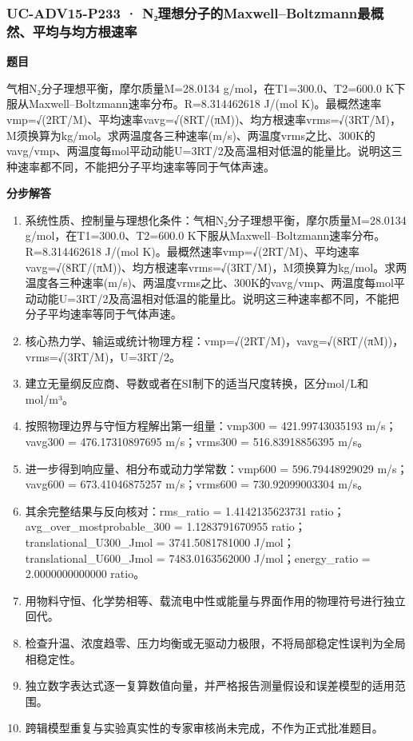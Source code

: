 \documentclass[UTF8,11pt,a4paper]{ctexart}
\begin{document}
\subsubsection*{UC-ADV15-P233 · N₂理想分子的Maxwell–Boltzmann最概然、平均与均方根速率}
\noindent\textbf{题目}\par
气相N₂分子理想平衡，摩尔质量M=28.0134 g/mol，在T1=300.0、T2=600.0 K下服从Maxwell–Boltzmann速率分布。R=8.314462618 J/(mol K)。最概然速率vmp=√(2RT/M)、平均速率vavg=√(8RT/(πM))、均方根速率vrms=√(3RT/M)，M须换算为kg/mol。求两温度各三种速率(m/s)、两温度vrms之比、300K的vavg/vmp、两温度每mol平动动能U=3RT/2及高温相对低温的能量比。说明这三种速率都不同，不能把分子平均速率等同于气体声速。\par
\medskip\noindent\textbf{分步解答}
\begin{enumerate}
\item 系统性质、控制量与理想化条件：气相N₂分子理想平衡，摩尔质量M=28.0134 g/mol，在T1=300.0、T2=600.0 K下服从Maxwell–Boltzmann速率分布。R=8.314462618 J/(mol K)。最概然速率vmp=√(2RT/M)、平均速率vavg=√(8RT/(πM))、均方根速率vrms=√(3RT/M)，M须换算为kg/mol。求两温度各三种速率(m/s)、两温度vrms之比、300K的vavg/vmp、两温度每mol平动动能U=3RT/2及高温相对低温的能量比。说明这三种速率都不同，不能把分子平均速率等同于气体声速。
\item 核心热力学、输运或统计物理方程：vmp=√(2RT/M)，vavg=√(8RT/(πM))，vrms=√(3RT/M)，U=3RT/2。
\item 建立无量纲反应商、导数或者在SI制下的适当尺度转换，区分mol/L和mol/m³。
\item 按照物理边界与守恒方程解出第一组量：vmp300 = 421.99743035193 m/s；vavg300 = 476.17310897695 m/s；vrms300 = 516.83918856395 m/s。
\item 进一步得到响应量、相分布或动力学常数：vmp600 = 596.79448929029 m/s；vavg600 = 673.41046875257 m/s；vrms600 = 730.92099003304 m/s。
\item 其余完整结果与反向核对：rms\_ratio = 1.4142135623731 ratio；avg\_over\_mostprobable\_300 = 1.1283791670955 ratio；translational\_U300\_Jmol = 3741.5081781000 J/mol；translational\_U600\_Jmol = 7483.0163562000 J/mol；energy\_ratio = 2.0000000000000 ratio。
\item 用物料守恒、化学势相等、载流电中性或能量与界面作用的物理符号进行独立回代。
\item 检查升温、浓度趋零、压力均衡或无驱动力极限，不将局部稳定性误判为全局相稳定性。
\item 独立数字表达式逐一复算数值向量，并严格报告测量假设和误差模型的适用范围。
\item 跨辑模型重复与实验真实性的专家审核尚未完成，不作为正式批准题目。
\end{enumerate}
\end{document}
